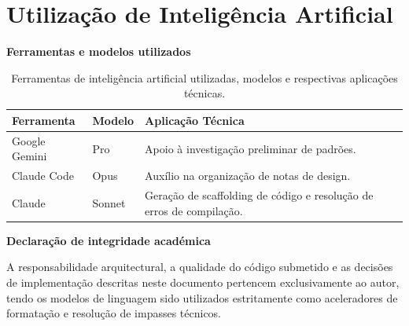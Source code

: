 %
%
\chapter*{Utilização de Inteligência Artificial}
\label{cha:declaracao-ia}

\vspace{0.4cm}
\noindent\textbf{Ferramentas e modelos utilizados}

\begin{table}[htbp]
    \centering
    \small
    \begin{tabular}{p{3.0cm} p{2.5cm} p{8.0cm}}
        \toprule
        \textbf{Ferramenta} & \textbf{Modelo} & \textbf{Aplicação Técnica} \\
        \midrule
        Google Gemini & Pro    & Apoio à investigação preliminar de padrões. \\
        \addlinespace
        Claude Code   & Opus   & Auxílio na organização de notas de design. \\
        \addlinespace
        Claude        & Sonnet & Geração de scaffolding de código e resolução de erros de compilação. \\
        \bottomrule
    \end{tabular}
    \caption[Ferramentas de IA utilizadas no desenvolvimento]{Ferramentas de inteligência artificial utilizadas, modelos e respectivas aplicações técnicas.}
    \label{tab:ferramentas-ia}
\end{table}

\vspace{0.4cm}
\noindent\textbf{Declaração de integridade académica}
\vspace{0.2cm}

A responsabilidade arquitectural, a qualidade do código submetido e as decisões de implementação descritas neste documento pertencem exclusivamente ao autor, tendo os modelos de linguagem sido utilizados estritamente como aceleradores de formatação e resolução de impasses técnicos.
